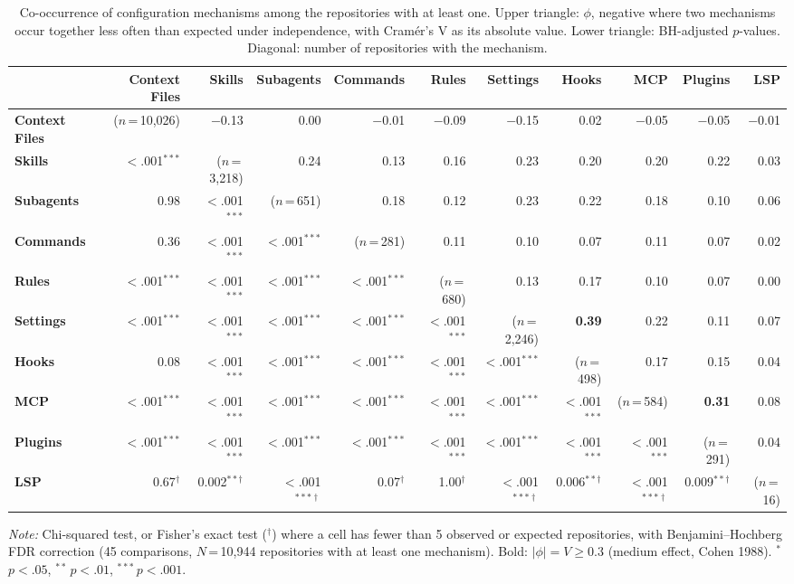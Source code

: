 \begin{table}[t]
\centering
\small
\caption{Co-occurrence of configuration mechanisms among the repositories with at least one. Upper triangle: $\phi$, negative where two mechanisms occur together less often than expected under independence, with Cramér's V as its absolute value. Lower triangle: BH-adjusted $p$-values. Diagonal: number of repositories with the mechanism.}
\label{tab:config-cooccurrence}
\begin{tabular}{lrrrrrrrrrr}
\toprule
 & \textbf{Context Files} & \textbf{Skills} & \textbf{Subagents} & \textbf{Commands} & \textbf{Rules} & \textbf{Settings} & \textbf{Hooks} & \textbf{MCP} & \textbf{Plugins} & \textbf{LSP} \\
\midrule
\textbf{Context Files} & ($n$\,=\,10,026) & $-$0.13 & 0.00 & $-$0.01 & $-$0.09 & $-$0.15 & 0.02 & $-$0.05 & $-$0.05 & $-$0.01 \\
\textbf{Skills} & $<$.001$^{***}$ & ($n$\,=\,3,218) & 0.24 & 0.13 & 0.16 & 0.23 & 0.20 & 0.20 & 0.22 & 0.03 \\
\textbf{Subagents} & 0.98 & $<$.001$^{***}$ & ($n$\,=\,651) & 0.18 & 0.12 & 0.23 & 0.22 & 0.18 & 0.10 & 0.06 \\
\textbf{Commands} & 0.36 & $<$.001$^{***}$ & $<$.001$^{***}$ & ($n$\,=\,281) & 0.11 & 0.10 & 0.07 & 0.11 & 0.07 & 0.02 \\
\textbf{Rules} & $<$.001$^{***}$ & $<$.001$^{***}$ & $<$.001$^{***}$ & $<$.001$^{***}$ & ($n$\,=\,680) & 0.13 & 0.17 & 0.10 & 0.07 & 0.00 \\
\textbf{Settings} & $<$.001$^{***}$ & $<$.001$^{***}$ & $<$.001$^{***}$ & $<$.001$^{***}$ & $<$.001$^{***}$ & ($n$\,=\,2,246) & \textbf{0.39} & 0.22 & 0.11 & 0.07 \\
\textbf{Hooks} & 0.08 & $<$.001$^{***}$ & $<$.001$^{***}$ & $<$.001$^{***}$ & $<$.001$^{***}$ & $<$.001$^{***}$ & ($n$\,=\,498) & 0.17 & 0.15 & 0.04 \\
\textbf{MCP} & $<$.001$^{***}$ & $<$.001$^{***}$ & $<$.001$^{***}$ & $<$.001$^{***}$ & $<$.001$^{***}$ & $<$.001$^{***}$ & $<$.001$^{***}$ & ($n$\,=\,584) & \textbf{0.31} & 0.08 \\
\textbf{Plugins} & $<$.001$^{***}$ & $<$.001$^{***}$ & $<$.001$^{***}$ & $<$.001$^{***}$ & $<$.001$^{***}$ & $<$.001$^{***}$ & $<$.001$^{***}$ & $<$.001$^{***}$ & ($n$\,=\,291) & 0.04 \\
\textbf{LSP} & 0.67$^{\dagger}$ & 0.002$^{**\dagger}$ & $<$.001$^{***\dagger}$ & 0.07$^{\dagger}$ & 1.00$^{\dagger}$ & $<$.001$^{***\dagger}$ & 0.006$^{**\dagger}$ & $<$.001$^{***\dagger}$ & 0.009$^{**\dagger}$ & ($n$\,=\,16) \\
\bottomrule
\end{tabular}
\vspace{2pt}
\begin{minipage}{\textwidth}
\centering
\footnotesize
\textit{Note:} Chi-squared test, or Fisher's exact test ($^{\dagger}$) where a cell has fewer than 5 observed or expected repositories, with Benjamini--Hochberg FDR correction (45 comparisons, $N$\,=\,10,944 repositories with at least one mechanism). Bold: $|\phi| = V \geq 0.3$ (medium effect, Cohen 1988). $^{*}$\,$p<.05$, $^{**}$\,$p<.01$, $^{***}$\,$p<.001$.
\end{minipage}
\end{table}
